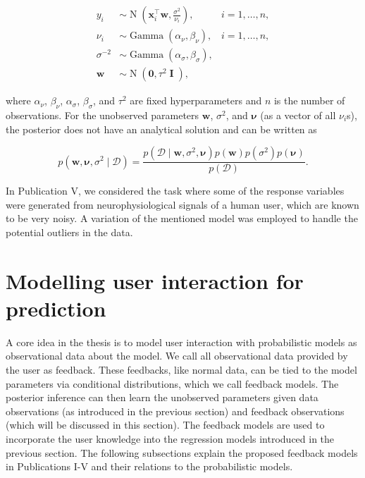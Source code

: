 \documentclass[dissertation,math,vertlayout,pdfa,colorlinks]{aaltoseries}
\newcommand{\bw}{\bm{w}}
\newcommand{\bD}{\mathcal{D}}
\DeclareMathOperator{\eye}{\textbf{I}}
\DeclareMathOperator{\normalpdf}{N}
\DeclareMathOperator{\gammapdf}{Gamma}
\newcommand{\tp}{^{\top}}
\begin{document}
	
\begin{align}\label{Eq:ard_Bayesian_regression}
y_i &\sim \normalpdf(\bm{x}_i\tp\bw,\frac{\sigma^2}{\nu_i}),  & i=1,\ldots,n,\\
\nu_i &\sim \gammapdf(\alpha_{\nu}, \beta_{\nu}), & i=1,\ldots,n,\nonumber \\
\sigma^{-2} &\sim \gammapdf(\alpha_{\sigma}, \beta_{\sigma}), \nonumber \\
\bw &\sim \normalpdf(\textbf{0},\tau^2 \eye), \nonumber
\end{align}

\noindent where $\alpha_{\nu}$, $\beta_{\nu}$, $\alpha_{\sigma}$, $\beta_{\sigma}$, and $\tau^2$ are fixed hyperparameters and $n$ is the number of observations. For the unobserved parameters $\bw$, $\sigma^2$, and $\bm{\nu}$ (as a vector of all $\nu_i$s), the posterior does not have an analytical solution and can be written as

\begin{equation}\label{Eq:Bayes_rule_ARD}
p(\bw, \bm{\nu}, \sigma^2 \mid \bD) = \frac{p(\bD \mid \bw, \sigma^2, \bm{\nu})p(\bw)p(\sigma^2)p(\bm{\nu})}{p(\bD)}.
\end{equation} 

\noindent In Publication V, we considered the task where some of the response variables were generated from neurophysiological  signals of a human user, which are known to be very noisy. A variation of the mentioned model was employed to handle the potential outliers in the data. 

\section{Modelling user interaction for prediction}\label{prob_model_user}

A core idea in the thesis is to model user interaction with probabilistic models as observational data about the model. We call all observational data provided by the user as feedback. 
These feedbacks, like normal data, can be tied to the model parameters via conditional distributions, which we call feedback models. The posterior inference can then learn the unobserved parameters given data observations (as introduced in the previous section) and feedback observations (which will be discussed in this section). The feedback models are used to incorporate the user knowledge into the regression models introduced in the previous section. The following subsections explain the proposed feedback models in Publications I-V and their relations to the probabilistic models.
\end{document}
